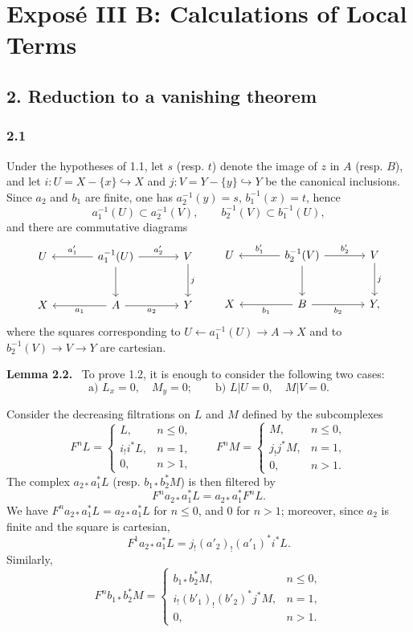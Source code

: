 \documentclass[11pt]{article}
\newenvironment{statement}[1]{\par\medskip\noindent\textbf{#1.}\ }{\par\medskip}
\begin{document}
\section*{Exposé III B: Calculations of Local Terms}

\subsection*{2. Reduction to a vanishing theorem}

\subsubsection*{2.1}
Under the hypotheses of 1.1, let $s$ (resp. $t$) denote the image of $z$ in $A$ (resp. $B$), and let $i:U=X-\{x\}\hookrightarrow X$ and $j:V=Y-\{y\}\hookrightarrow Y$ be the canonical inclusions. Since $a_2$ and $b_1$ are finite, one has $a_2^{-1}(y)=s$, $b_1^{-1}(x)=t$, hence
\[
a_1^{-1}(U)\subset a_2^{-1}(V),\qquad b_2^{-1}(V)\subset b_1^{-1}(U),
\]
and there are commutative diagrams
\[
\begin{tikzcd}[column sep=large,row sep=large]
U & a_1^{-1}(U) \arrow[l,"a'_1"'] \arrow[r,"a'_2"] \arrow[d] & V \arrow[d,"j"]\\
X & A \arrow[l,"a_1"] \arrow[r,"a_2"'] & Y
\end{tikzcd}
\qquad
\begin{tikzcd}[column sep=large,row sep=large]
U & b_2^{-1}(V) \arrow[l,"b'_1"'] \arrow[r,"b'_2"] \arrow[d] & V \arrow[d,"j"]\\
X & B \arrow[l,"b_1"] \arrow[r,"b_2"'] & Y ,
\end{tikzcd}
\]
where the squares corresponding to $U\leftarrow a_1^{-1}(U)\to A\to X$ and to $b_2^{-1}(V)\to V\to Y$ are cartesian.

\begin{statement}{Lemma 2.2}
To prove 1.2, it is enough to consider the following two cases:
\[
\text{a) } L_x=0,\quad M_y=0;\qquad
\text{b) } L|U=0,\quad M|V=0 .
\]
\end{statement}

Consider the decreasing filtrations on $L$ and $M$ defined by the subcomplexes
\[
F^nL=
\begin{cases}
L,& n\le 0,\\
i_!i^*L,& n=1,\\
0,& n>1,
\end{cases}
\qquad
F^nM=
\begin{cases}
M,& n\le 0,\\
j_!j^*M,& n=1,\\
0,& n>1.
\end{cases}
\]
The complex $a_{2*}a_1^*L$ (resp. $b_{1*}b_2^*M$) is then filtered by
\[
F^n a_{2*}a_1^*L=a_{2*}a_1^*F^nL.
\]
We have $F^n a_{2*}a_1^*L=a_{2*}a_1^*L$ for $n\le0$, and $0$ for $n>1$; moreover, since $a_2$ is finite and the square is cartesian,
\[
F^1a_{2*}a_1^*L=j_!(a'_2)_!(a'_1)^*i^*L.
\]
Similarly,
\[
F^n b_{1*}b_2^*M=
\begin{cases}
b_{1*}b_2^*M,& n\le 0,\\
i_!(b'_1)_!(b'_2)^*j^*M,& n=1,\\
0,& n>1.
\end{cases}
\]
\end{document}
